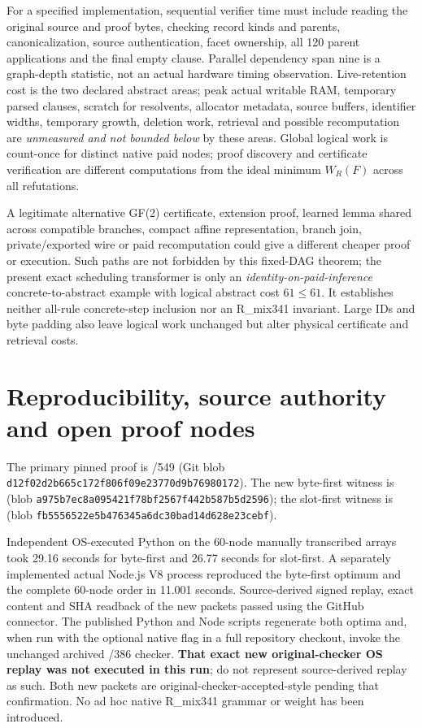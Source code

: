 \documentclass[11pt]{article}
\begin{document}
For a specified implementation, sequential verifier time must include reading the original source and proof bytes, checking record kinds and parents, canonicalization, source authentication, facet ownership, all 120 parent applications and the final empty clause. Parallel dependency span nine is a graph-depth statistic, not an actual hardware timing observation. Live-retention cost is the two declared abstract areas; peak actual writable RAM, temporary parsed clauses, scratch for resolvents, allocator metadata, source buffers, identifier widths, temporary growth, deletion work, retrieval and possible recomputation are \emph{unmeasured and not bounded below} by these areas. Global logical work is count-once for distinct native paid nodes; proof discovery and certificate verification are different computations from the ideal minimum $W_R(F)$ across all refutations.

A legitimate alternative GF(2) certificate, extension proof, learned lemma shared across compatible branches, compact affine representation, branch join, private/exported wire or paid recomputation could give a different cheaper proof or execution. Such paths are not forbidden by this fixed-DAG theorem; the present exact scheduling transformer is only an \emph{identity-on-paid-inference} concrete-to-abstract example with logical abstract cost $61\le 61$. It establishes neither all-rule concrete-step inclusion nor an R_mix341 invariant. Large IDs and byte padding also leave logical work unchanged but alter physical certificate and retrieval costs.

\section*{Reproducibility, source authority and open proof nodes}
The primary pinned proof is /549 (Git blob \texttt{d12f02d2b665c172f806f09e23770d9b76980172}). The new byte-first witness is
(blob \texttt{a975b7ec8a095421f78bf2567f442b587b5d2596}); the slot-first witness is
(blob \texttt{fb5556522e5b476345a6dc30bad14d628e23cebf}).

Independent OS-executed Python on the 60-node manually transcribed arrays took 29.16 seconds for byte-first and 26.77 seconds for slot-first. A separately implemented actual Node.js V8 process reproduced the byte-first optimum and the complete 60-node order in 11.001 seconds. Source-derived signed replay, exact content and SHA readback of the new packets passed using the GitHub connector. The published Python and Node scripts regenerate both optima and, when run with the optional native flag in a full repository checkout, invoke the unchanged archived /386 checker. \textbf{That exact new original-checker OS replay was not executed in this run}; do not represent source-derived replay as such. Both new packets are original-checker-accepted-style pending that confirmation. No ad hoc native R_mix341 grammar or weight has been introduced.
\end{document}
